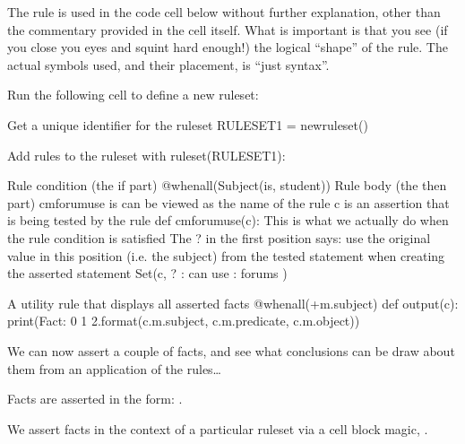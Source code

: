 \documentclass[letterpaper,10pt,english]{sphinxmanual}
\begin{document}
{The rule is used in the code cell below without further explanation, other than the commentary provided in the cell itself. What is important is that you see (if you close you eyes and squint hard enough!) the logical “shape” of the rule. The actual symbols used, and their placement, is “just syntax”.

Run the following cell to define a new ruleset:

{
\begin{sphinxVerbatim}[commandchars=\\\{\}]
\llap{\color{nbsphinxin}[ ]:\,\hspace{\fboxrule}\hspace{\fboxsep}}\PYGZsh{} Get a unique identifier for the ruleset
RULESET\PYGZus{}1 = new\PYGZus{}ruleset()

\PYGZsh{} Add rules to the ruleset
with ruleset(RULESET\PYGZus{}1):

    \PYGZsh{} Rule condition (the \PYGZdq{}if\PYGZdq{} part)
    @when\PYGZus{}all(Subject(\PYGZdq{}is\PYGZdq{}, \PYGZdq{}student\PYGZdq{}))
    \PYGZsh{} Rule body (the \PYGZdq{}then\PYGZdq{} part)
    \PYGZsh{} \PYGZhy{} cm\PYGZus{}forum\PYGZus{}use is can be viewed as the name of the rule
    \PYGZsh{} \PYGZhy{} c is an assertion that is being tested by the rule
    def cm\PYGZus{}forum\PYGZus{}use(c):
        \PYGZsh{} This is what we actually do when the rule condition is satisfied
        \PYGZsh{} The ? in the first position says:
        \PYGZsh{}   \PYGZdq{}\PYGZdq{}\PYGZdq{}use the original value in this position (i.e. the subject)
        \PYGZsh{}      from the tested statement when creating the asserted statement\PYGZdq{}\PYGZdq{}\PYGZdq{}
        Set(c, \PYGZsq{}? : can use : forums\PYGZsq{} )

    \PYGZsh{}A \PYGZdq{}utility\PYGZdq{} rule that displays all asserted facts
    @when\PYGZus{}all(+m.subject)
    def output(c):
        print(\PYGZsq{}Fact: \PYGZob{}0\PYGZcb{} \PYGZob{}1\PYGZcb{} \PYGZob{}2\PYGZcb{}\PYGZsq{}.format(c.m.subject, c.m.predicate, c.m.object))
\end{sphinxVerbatim}
}

We can now assert a couple of facts, and see what conclusions can be draw about them from an application of the rules…

Facts are asserted in the form: .

We assert facts in the context of a particular ruleset via a cell block magic, .

}
\end{document}
